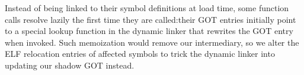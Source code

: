 Instead of being linked to their symbol definitions at load
time, some function calls resolve lazily the first time they are called:\@ their GOT
entries initially point to a special lookup function in the dynamic linker that
rewrites the GOT entry when invoked.  Such memoization would remove our intermediary,
so we alter the ELF relocation entries of affected symbols to trick the dynamic
linker into updating our shadow GOT instead.

